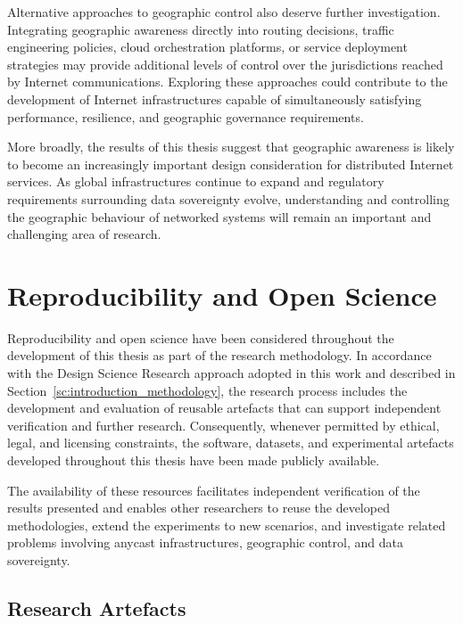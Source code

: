 Alternative approaches to geographic control also deserve further investigation. Integrating geographic awareness directly into routing decisions, traffic engineering policies, cloud orchestration platforms, or service deployment strategies may provide additional levels of control over the jurisdictions reached by Internet communications. Exploring these approaches could contribute to the development of Internet infrastructures capable of simultaneously satisfying performance, resilience, and geographic governance requirements.

More broadly, the results of this thesis suggest that geographic awareness is likely to become an increasingly important design consideration for distributed Internet services. As global infrastructures continue to expand and regulatory requirements surrounding data sovereignty evolve, understanding and controlling the geographic behaviour of networked systems will remain an important and challenging area of research.

\section{Reproducibility and Open Science}
\label{sc:conclusion_reproducibility}

Reproducibility and open science have been considered throughout the development of this thesis as part of the research methodology. In accordance with the Design Science Research approach adopted in this work and described in Section~\ref{sc:introduction_methodology}, the research process includes the development and evaluation of reusable artefacts that can support independent verification and further research. Consequently, whenever permitted by ethical, legal, and licensing constraints, the software, datasets, and experimental artefacts developed throughout this thesis have been made publicly available.

The availability of these resources facilitates independent verification of the results presented and enables other researchers to reuse the developed methodologies, extend the experiments to new scenarios, and investigate related problems involving anycast infrastructures, geographic control, and data sovereignty.

\subsection{Research Artefacts}
\label{sc:conclusion_research_artefacts}

